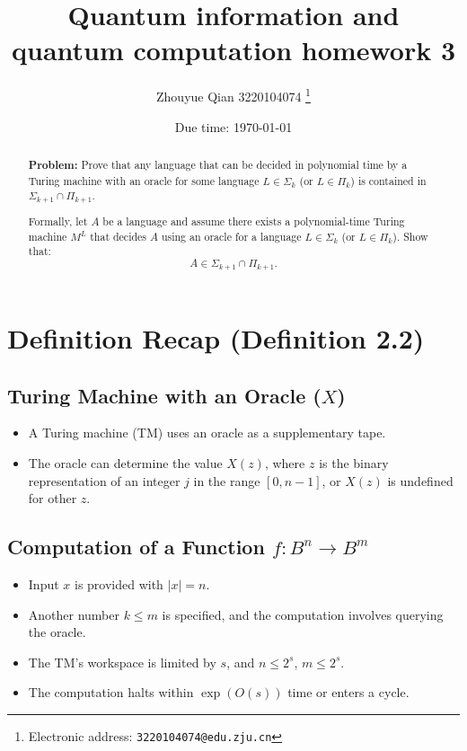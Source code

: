 \documentclass[a4paper]{article}
\begin{document}
\title{Quantum information and quantum computation homework 3}

\author{Zhouyue Qian 3220104074
  \thanks{Electronic address: \texttt{3220104074@edu.zju.cn}}}


\date{Due time: \today}

\maketitle

\begin{abstract}
    \noindent\textbf{Problem:}  
    Prove that any language that can be decided in polynomial time by a Turing machine with an oracle for some language \( L \in \Sigma_k \) (or \( L \in \Pi_k \)) is contained in \(\Sigma_{k+1} \cap \Pi_{k+1}\).

    Formally, let \(A\) be a language and assume there exists a polynomial-time Turing machine \(M^L\) that decides \(A\) using an oracle for a language \(L \in \Sigma_k\) (or \(L \in \Pi_k\)). Show that:
    \[
    A \in \Sigma_{k+1} \cap \Pi_{k+1}.
    \]

\end{abstract}

\section*{Definition Recap (Definition 2.2)}

\subsection*{Turing Machine with an Oracle (\( X \))}
\begin{itemize}
    \item A Turing machine (TM) uses an oracle as a supplementary tape.
    \item The oracle can determine the value \( X(z) \), where \( z \) is the binary representation of an integer \( j \) in the range \([0, n-1]\), or \( X(z) \) is undefined for other \( z \).
\end{itemize}

\subsection*{Computation of a Function \( f:B^n \to B^m \)}
\begin{itemize}
    \item Input \( x \) is provided with \( |x| = n \).
    \item Another number \( k \leq m \) is specified, and the computation involves querying the oracle.
    \item The TM's workspace is limited by \( s \), and \( n \leq 2^s \), \( m \leq 2^s \).
    \item The computation halts within \( \exp(O(s)) \) time or enters a cycle.
\end{itemize}
\end{document}
